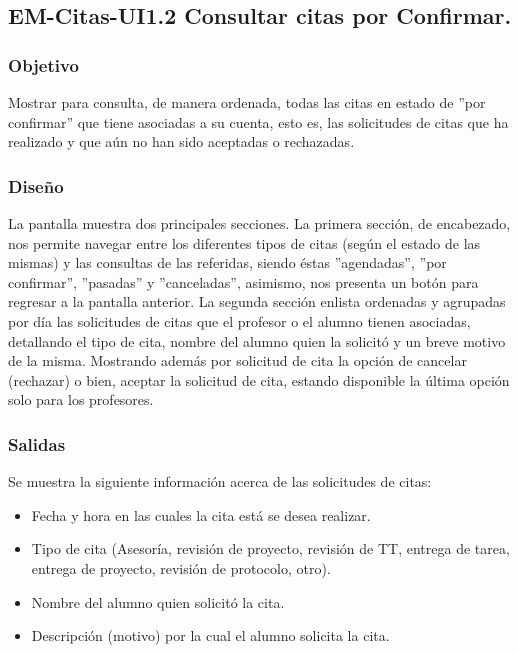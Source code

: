 \pagebreak

\subsection{EM-Citas-UI1.2 Consultar citas por Confirmar.}

\subsubsection{Objetivo}
	\noindent
	Mostrar para consulta, de manera ordenada, todas las citas en estado de ''por confirmar'' que tiene asociadas a su cuenta, esto es, las solicitudes de citas que ha realizado y que aún no han sido aceptadas o rechazadas. 

\subsubsection{Diseño}
	\noindent
	La pantalla muestra dos principales secciones. La primera sección, de encabezado, nos permite navegar entre los diferentes tipos de citas (según el estado de las mismas) y las consultas de las referidas, siendo éstas ''agendadas'', ''por confirmar'', ''pasadas'' y ''canceladas'', asimismo, nos presenta un botón para regresar a la pantalla anterior.
	\newline
	La segunda sección enlista ordenadas y agrupadas por día las solicitudes de citas que el profesor o el alumno tienen asociadas, detallando el tipo de cita, nombre del alumno quien la solicitó y un breve motivo de la misma. Mostrando además por solicitud de cita la opción de cancelar (rechazar) o bien, aceptar la solicitud de cita, estando disponible la última opción solo para los profesores. 

\pagebreak
{}

\subsubsection{Salidas}
	\noindent
	Se muestra la siguiente información acerca de las solicitudes de citas:
		\begin{itemize}
			\item Fecha y hora en las cuales la cita está se desea realizar.
			\item Tipo de cita (Asesoría, revisión de proyecto, revisión de TT, entrega de tarea, entrega de proyecto, revisión de protocolo, otro).
			\item Nombre del alumno quien solicitó la cita.
			\item Descripción (motivo) por la cual el alumno solicita la cita.
		\end{itemize}

